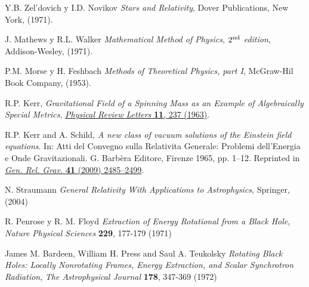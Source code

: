 \begin{thebibliography}{99}
 Y.B. Zel'dovich y I.D. Novikov  \textit{Stars and Relativity}, Dover Publications, New York, (1971).

 J. Mathews y R.L. Walker  \textit{Mathematical Method of Physics, $2^{\rm nd}$ edition}, Addison-Wesley, (1971).

 P.M. Morse y H. Feshbach  \textit{Methods of Theoretical Physics, part I}, McGraw-Hil Book Company,  (1953).

 R.P. Kerr,  \textit{Gravitational Field of a Spinning Mass as an Example of Algebraically Special Metrics}, \href{https://doi.org/10.1103/PhysRevLett.11.237}{  \textsl{Physical Review Letters }   \textbf{11}, 237 (1963)}.

 R.P. Kerr and A. Schild,  \textit{A new class of vacuum solutions of the Einstein field equations}. In: Atti del Convegno sulla Relativita Generale: Problemi dell’Energia e Onde Gravitazionali. G. Barbèra Editore, Firenze 1965, pp. 1–12. Reprinted in \href{http://dx.doi.org/10.1007/s10714-009-0856-0}{  \textsl{Gen. Rel. Grav.}   \textbf{41} (2009) 2485--2499}. 

 N. Straumann  \textit{General Relativity With Applications to Astrophysics}, Springer, (2004)

 R. Penrose y R. M. Floyd  \textit{Extraction of Energy Rotational from a Black Hole},   \textsl{Nature Physical Sciences}   \textbf{229}, 177-179 (1971)

 James M. Bardeen, William H. Press and Saul A. Teukolsky  \textit{Rotating Black Holes: Locally Nonrotating Frames, Energy Extraction, and Scalar Synchrotron Radiation},   \textsl{The Astrophysical Journal}   \textbf{178}, 347-369 (1972)
\end{thebibliography}
